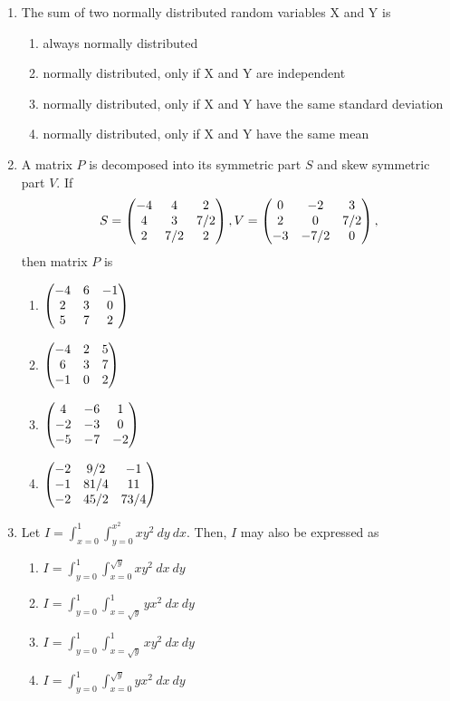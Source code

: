\documentclass[12pt,onecolumn]{article}
\begin{document}
\begin{enumerate}
    \item The sum of two normally distributed random variables X and Y is
          \begin{enumerate}
              \item always normally distributed
              \item normally distributed, only if X and Y are independent
              \item normally distributed, only if X and Y have the same standard deviation
              \item normally distributed, only if X and Y have the same mean
          \end{enumerate}

    \item A matrix $P$ is decomposed into its symmetric part $S$ and skew symmetric part $V$. If
          \[ S = \begin{pmatrix}-4 & 4 & 2 \\ 4 & 3 & 7/2 \\ 2 & 7/2 & 2\end{pmatrix}, V = \begin{pmatrix}0 & -2 & 3 \\ 2 & 0 & 7/2 \\ -3 & -7/2 & 0\end{pmatrix}, \]
          then matrix $P$ is
          \begin{enumerate}
              \item $\begin{pmatrix}-4 & 6 & -1 \\ 2 & 3 & 0 \\ 5 & 7 & 2\end{pmatrix}$
              \item $\begin{pmatrix}-4 & 2 & 5 \\ 6 & 3 & 7 \\ -1 & 0 & 2\end{pmatrix}$
              \item $\begin{pmatrix}4 & -6 & 1 \\ -2 & -3 & 0 \\ -5 & -7 & -2\end{pmatrix}$
              \item $\begin{pmatrix}-2 & 9/2 & -1 \\ -1 & 81/4 & 11 \\ -2 & 45/2 & 73/4\end{pmatrix}$
          \end{enumerate}

    \item Let $I = \int_{x=0}^{1}\int_{y=0}^{x^2}xy^2~dy~dx$. Then, $I$ may also be expressed as
          \begin{enumerate}
              \item $I = \int_{y=0}^{1}\int_{x=0}^{\sqrt{y}}xy^2~dx~dy$
              \item $I = \int_{y=0}^{1}\int_{x=\sqrt{y}}^{1}yx^2~dx~dy$
              \item $I = \int_{y=0}^{1}\int_{x=\sqrt{y}}^{1}xy^2~dx~dy$
              \item $I = \int_{y=0}^{1}\int_{x=0}^{\sqrt{y}}yx^2~dx~dy$
          \end{enumerate}


\end{enumerate}
\end{document}
